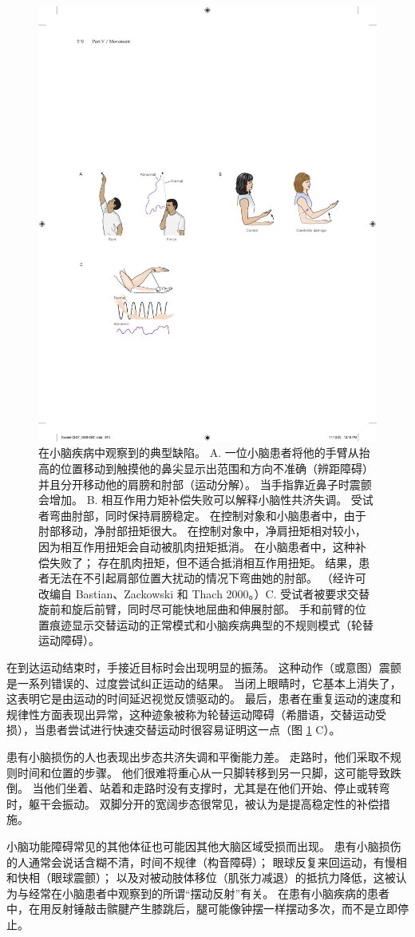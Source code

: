 \begin{figure}[htbp]
	\centering
	\includegraphics[width=0.5\linewidth]{chap37/fig_37_1}
	\caption{在小脑疾病中观察到的典型缺陷。
		A. 一位小脑患者将他的手臂从抬高的位置移动到触摸他的鼻尖显示出范围和方向不准确（辨距障碍）并且分开移动他的肩膀和肘部（运动分解）。 
		当手指靠近鼻子时震颤会增加。 
		B. 相互作用力矩补偿失败可以解释小脑性共济失调。 受试者弯曲肘部，同时保持肩膀稳定。 在控制对象和小脑患者中，由于肘部移动，净肘部扭矩很大。 在控制对象中，净肩扭矩相对较小，因为相互作用扭矩会自动被肌肉扭矩抵消。 在小脑患者中，这种补偿失败了； 存在肌肉扭矩，但不适合抵消相互作用扭矩。 结果，患者无法在不引起肩部位置大扰动的情况下弯曲她的肘部。 （经许可改编自 Bastian、Zackowski 和 Thach 2000。）C. 受试者被要求交替旋前和旋后前臂，同时尽可能快地屈曲和伸展肘部。 手和前臂的位置痕迹显示交替运动的正常模式和小脑疾病典型的不规则模式（轮替运动障碍）。}
	\label{fig:37_1}
\end{figure}


在到达运动结束时，手接近目标时会出现明显的振荡。 这种动作（或意图）震颤是一系列错误的、过度尝试纠正运动的结果。 当闭上眼睛时，它基本上消失了，这表明它是由运动的时间延迟视觉反馈驱动的。 最后，患者在重复运动的速度和规律性方面表现出异常，这种迹象被称为轮替运动障碍（希腊语，交替运动受损），当患者尝试进行快速交替运动时很容易证明这一点（图 \ref{fig:37_1} C）。

患有小脑损伤的人也表现出步态共济失调和平衡能力差。 走路时，他们采取不规则时间和位置的步骤。 他们很难将重心从一只脚转移到另一只脚，这可能导致跌倒。 当他们坐着、站着和走路时没有支撑时，尤其是在他们开始、停止或转弯时，躯干会振动。 双脚分开的宽阔步态很常见，被认为是提高稳定性的补偿措施。

小脑功能障碍常见的其他体征也可能因其他大脑区域受损而出现。 患有小脑损伤的人通常会说话含糊不清，时间不规律（构音障碍）； 眼球反复来回运动，有慢相和快相（眼球震颤）； 以及对被动肢体移位（肌张力减退）的抵抗力降低，这被认为与经常在小脑患者中观察到的所谓“摆动反射”有关。 在患有小脑疾病的患者中，在用反射锤敲击髌腱产生膝跳后，腿可能像钟摆一样摆动多次，而不是立即停止。

